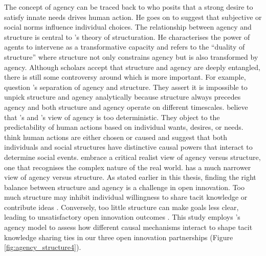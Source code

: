 The concept of agency can be traced back to \citet{parsons1937structure} who posits that a strong desire to satisfy innate needs drives human action. He goes on to suggest that subjective or social norms influence individual choices. The relationship between agency and structure is central to \citeauthor{giddens1984constitution}'s \citeyearpar{giddens1984constitution} theory of structuration. He characterises the power of agents to intervene as a transformative capacity and refers to the \enquote{duality of structure} where structure not only constrains agency but is also transformed by agency. Although scholars accept that structure and agency are deeply entangled, there is still some controversy around which is more important. For example, \citet{archer1998critical} question \citeauthor{giddens1984constitution}'s \citeyearpar{giddens1984constitution} separation of agency and structure. They assert it is impossible to unpick structure and agency analytically because structure always precedes agency and both structure and agency operate on different timescales. \citet{loyal2001agency} believe that \citeauthor{parsons1937structure}'s \citeyearpar{parsons1937structure} and \citeauthor{giddens1984constitution}'s \citeyearpar{giddens1984constitution} view of agency is too deterministic. They object to the predictability of human actions based on individual wants, desires, or needs. \citet{loyal2001agency} think human actions are either chosen or caused and suggest that both individuals and social structures have distinctive causal powers that interact to determine social events. \citet{loyal2001agency} embrace a critical realist view of agency versus structure, one that recognises the complex nature of the real world. \citet{giddens1984constitution} has a much narrower view of agency versus structure. As stated earlier in this thesis, finding the right balance between structure and agency is a challenge in open innovation. Too much structure may inhibit individual willingness to share tacit knowledge or contribute ideas \citep{davis2010agency}. Conversely, too little structure can make goals less clear, leading to unsatisfactory open innovation outcomes \citep{lam2000tacit}. This study employs \citeauthor{loyal2001agency}'s \citeyearpar{loyal2001agency} agency model to assess how different causal mechanisms interact to shape tacit knowledge sharing ties in our three open innovation partnerships (Figure \ref{fig:agency_structure4}). 

